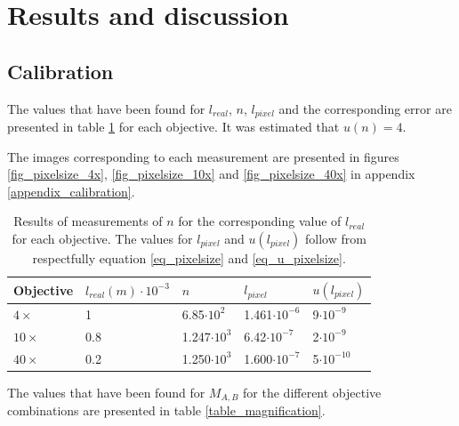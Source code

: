 \section{Results and discussion}

\subsection{Calibration}

The values that have been found for $l_{real}$, $n$, $l_{pixel}$ and the corresponding error are presented in table \ref{table_pixelsize} for each objective. It was estimated that $u(n) = 4$.

The images corresponding to each measurement are presented in figures \ref{fig_pixelsize_4x}, \ref{fig_pixelsize_10x} and \ref{fig_pixelsize_40x} in appendix \ref{appendix_calibration}.

\begin{table}[h!]


\centering
\captionsetup{font=small, justification = centering}
  \caption{Results of measurements of $n$ for the corresponding value of $l_{real}$ for each objective. The values for $l_{pixel}$ and $u(l_{pixel})$ follow from respectfully equation \ref{eq_pixelsize} and \ref{eq_u_pixelsize}.}

\begin{tabular}{|l|l|l|l|l|}
\hline

Objective & $l_{real} (m) \cdot 10^{-3}$ & $n$ & $l_{pixel}$ & $u(l_{pixel})$ \\ \hline
$4\times$ & 1 & 6.85$\cdot 10^2$ & 1.461$\cdot 10^{-6}$ & 9$\cdot 10^{-9}$\\
$10\times$ & 0.8 & 1.247$\cdot 10^3$ & 6.42$\cdot 10^{-7}$ & 2$\cdot 10^{-9}$ \\
$40\times$ & 0.2 & 1.250$\cdot 10^3$ & 1.600$\cdot 10^{-7}$ & 5$\cdot 10^{-10}$ \\ \hline
\end{tabular}

\label{table_pixelsize}
\end{table}


The values that have been found for $M_{A,B}$ for the different objective combinations are presented in table \ref{table_magnification}.

